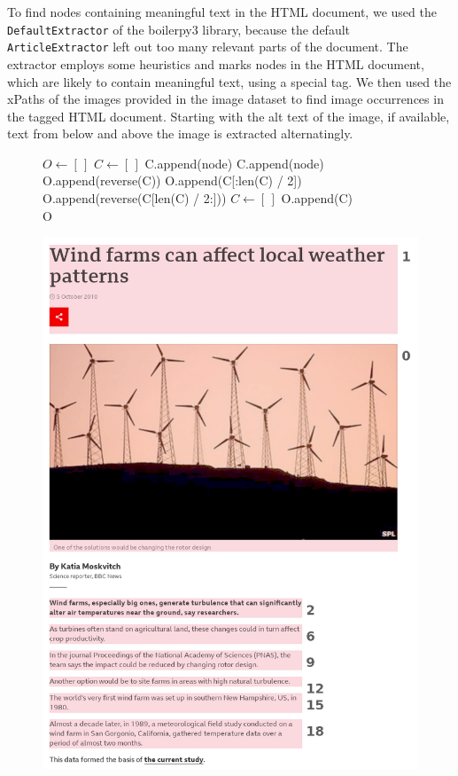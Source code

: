 \documentclass[
]{ceurart}
\begin{document}
To find nodes containing meaningful text in the HTML document, we used the \texttt{DefaultExtractor} of the boilerpy3 library, because the default \texttt{ArticleExtractor} left out too many relevant parts of the document. The extractor employs some heuristics and marks nodes in the HTML document, which are likely to contain meaningful text, using a special tag. We then used the xPaths of the images provided in the image dataset to find image occurrences in the tagged HTML document. Starting with the alt text of the image, if available, text from below and above the image is extracted alternatingly.

\begin{figure}[htbp]
	\begin{minipage}[b]{.45\textwidth}
\begin{algorithmic}
	\State $O \gets [\,]$
	\State $C \gets [\,]$
			\State C.append(node)
		\EndIf
			\State C.append(node)
				\State O.append(reverse(C))
			\Else
				\State O.append(C[:len(C) / 2])
				\State O.append(reverse(C[len(C) / 2:]))
			\EndIf
			\State $C \gets [\,]$
		\EndIf
	\EndFor
\State O.append(C) \\
\Return O
\end{algorithmic}
\end{minipage}
\hfill
\begin{minipage}[b]{.41\textwidth}
	\includegraphics[width=\textwidth]{figures/bbc-news-1.png}

\end{minipage}
\end{figure}
\end{document}
